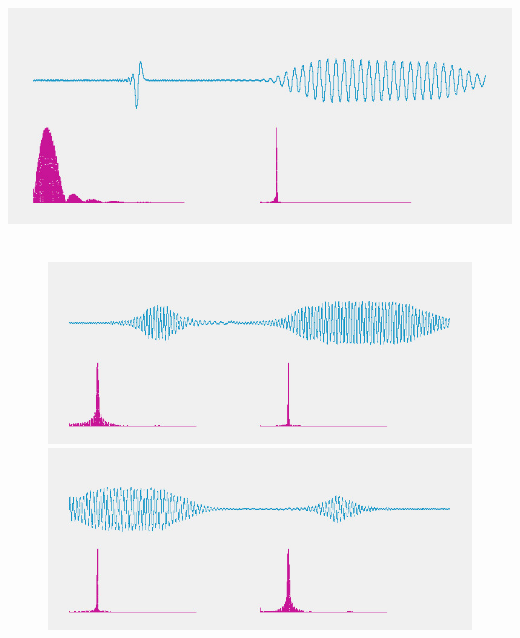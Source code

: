 \begin{titlepage}
\begin{center}

\includegraphics[width=.7\textwidth]{./titre/heisenberg}
\label{fig:image1}
~\\[1cm]

\begin{figure}[htbp]
\begin{minipage}[c]{.45\linewidth}
\begin{center}
\includegraphics[scale=0.25]{./titre/heisenberg2}
\end{center}
\end{minipage}
\hfill
\begin{minipage}[c]{.45\linewidth}
\begin{center}
\includegraphics[scale=0.25]{./titre/heisenberg3}
\end{center}
\end{minipage}
\end{figure}
~\\[1cm]


\end{center}
\end{titlepage}
